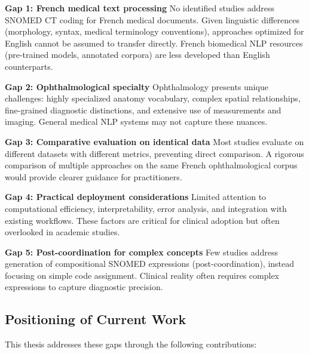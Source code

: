 \textbf{Gap 1: French medical text processing}
No identified studies address SNOMED CT coding for French medical documents. Given linguistic differences (morphology, syntax, medical terminology conventions), approaches optimized for English cannot be assumed to transfer directly. French biomedical NLP resources (pre-trained models, annotated corpora) are less developed than English counterparts.

\textbf{Gap 2: Ophthalmological specialty}
Ophthalmology presents unique challenges: highly specialized anatomy vocabulary, complex spatial relationships, fine-grained diagnostic distinctions, and extensive use of measurements and imaging. General medical NLP systems may not capture these nuances.

\textbf{Gap 3: Comparative evaluation on identical data}
Most studies evaluate on different datasets with different metrics, preventing direct comparison. A rigorous comparison of multiple approaches on the same French ophthalmological corpus would provide clearer guidance for practitioners.

\textbf{Gap 4: Practical deployment considerations}
Limited attention to computational efficiency, interpretability, error analysis, and integration with existing workflows. These factors are critical for clinical adoption but often overlooked in academic studies.

\textbf{Gap 5: Post-coordination for complex concepts}
Few studies address generation of compositional SNOMED expressions (post-coordination), instead focusing on simple code assignment. Clinical reality often requires complex expressions to capture diagnostic precision.

\subsection{Positioning of Current Work}

This thesis addresses these gaps through the following contributions:

